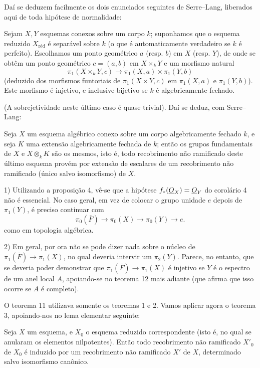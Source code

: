 Daí se deduzem facilmente os dois enunciados seguintes de Serre--Lang,
liberados aqui de toda hipótese de normalidade:

 Sejam $X,Y$ esquemas conexos sobre um corpo $k$;
suponhamos que o esquema reduzido $X_{\mathrm{réd}}$ é separável sobre $k$
(o que é automaticamente verdadeiro se $k$ é perfeito).
Escolhamos um ponto geométrico $a$ (resp. $b$) em $X$ (resp. $Y$), de onde se
obtêm um ponto geométrico $c=(a,b)$ em $X\times_kY$ e um morfismo natural
\[
  \pi_1(X\times_kY,c)\longrightarrow
  \pi_1(X,a)\times\pi_1(Y,b)
\]
(deduzido dos morfismos funtoriais de $\pi_1(X\times Y,c)$ em $\pi_1(X,a)$
e $\pi_1(Y,b)$). Este morfismo é injetivo, e inclusive bijetivo se $k$ é
algebricamente fechado.

(A sobrejetividade neste último caso é quase trivial). Daí se deduz,
com Serre--Lang:

 Seja $X$ um esquema algébrico conexo sobre um corpo
algebricamente fechado $k$, e seja $K$ uma extensão algebricamente fechada
de $k$; então os grupos fundamentais de $X$ e $X\otimes_kK$ são os
mesmos, isto é, todo recobrimento não ramificado deste último esquema
provém por extensão de escalares de um recobrimento não ramificado (único
salvo isomorfismo) de $X$.


1) Utilizando a proposição 4, vê-se que a hipótese
$f_*(\underline{O}_X)=\underline{O}_Y$ do corolário 4 não é essencial. No caso geral, em vez
de colocar o grupo unidade $e$ depois de $\pi_1(Y)$, é preciso continuar com
\[
  \pi_0(\overline F)\longrightarrow\pi_0(X)
  \longrightarrow\pi_0(Y)\longrightarrow e.
\]
como em topologia algébrica.

2) Em geral, por ora não se pode dizer nada sobre o núcleo de
$\pi_1(\overline F)\longrightarrow\pi_1(X)$, no qual deveria intervir um
$\pi_2(Y)$. Parece, no entanto, que se deveria poder demonstrar que
$\pi_1(\overline F)\longrightarrow\pi_1(X)$ é injetivo se $Y$ é o espectro
de um anel local $A$, apoiando-se no teorema 12 mais adiante (que afirma que
isso ocorre se $A$ é completo).

O teorema 11 utilizava somente os teoremas 1 e 2. Vamos aplicar agora o
teorema 3, apoiando-nos no lema elementar seguinte:

 Seja $X$ um esquema, e $X_0$ o esquema reduzido correspondente
(isto é, no qual se anularam os elementos nilpotentes). Então todo
recobrimento não ramificado $X'_0$ de $X_0$ é induzido por um recobrimento
não ramificado $X'$ de $X$, determinado salvo isomorfismo canônico.

